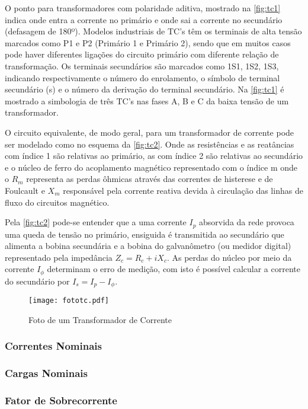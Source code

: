			O ponto para transformadores com polaridade aditiva, mostrado na \autoref{fig:tc1} indica onde entra a corrente no primário e onde sai a corrente no secundário (defasagem de 180º). Modelos industriais de TC’s têm os terminais de alta tensão marcados como P1 e P2 (Primário 1 e Primário 2), sendo que em muitos casos pode haver diferentes ligações do circuito primário com diferente relação de transformação. Os terminais secundários são marcados como 1S1, 1S2, 1S3, indicando respectivamente o número do enrolamento, o símbolo de terminal secundário (s) e o número da derivação do terminal secundário. Na \autoref{fig:tc1} é mostrado a simbologia de três TC's nas fases A, B e C da baixa tensão de um transformador.\par
			O circuito equivalente, de modo geral, para um transformador de corrente pode ser modelado como no esquema da \autoref{fig:tc2}. Onde as resistências e as reatâncias com índice 1 são relativas ao primário, as com índice 2 são relativas ao secundário e o núcleo de ferro do acoplamento magnético representado com o índice m onde o $R_m$ representa as perdas ôhmicas através das correntes de histerese e de Foulcault e $X_m$ responsável pela corrente reativa devida à circulação das linhas de fluxo do circuitos magnético. \cite{mamedemanual}\par
			Pela \autoref{fig:tc2} pode-se entender que a uma corrente $I_p$ absorvida da rede provoca uma queda de tensão no primário, ensiguida é transmitida ao secundário que alimenta a bobina secundária e a bobina do galvanômetro (ou medidor digital) representado pela impedância $Z_c=R_c+iX_c$. As perdas do núcleo por meio da corrente $I_\phi$ determinam o erro de medição, com isto é possível calcular a corrente do secundário por $I_s=I_p-I_\phi$.\par
			\begin{figure}[htb]
				\caption{Foto de um Transformador de Corrente}
				\centering
				\texttt{[image: fototc.pdf]}
				\label{fig:fototc}
				\end{figure}
			\subsubsection{Correntes Nominais}
			\subsubsection{Cargas Nominais}			
			\subsubsection{Fator de Sobrecorrente}
